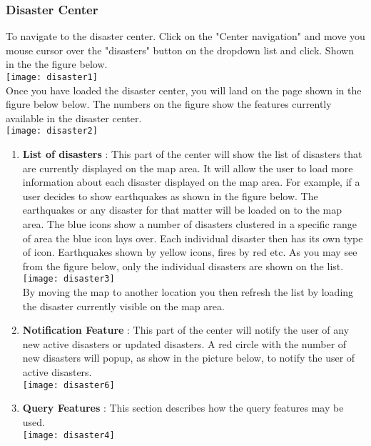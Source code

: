 \subsubsection{Disaster Center}
To navigate to the disaster center. Click on the "Center navigation" and move you mouse cursor over the "disasters" button on the dropdown list and click. Shown in the the figure below. \\[0.5cm]
\texttt{[image: disaster1]} \\[0.5cm]
Once you have loaded the disaster center, you will land on the page shown in the figure below below. The numbers on the figure show the features currently available in the disaster center. \\[0.5cm]
\texttt{[image: disaster2]} \\[0.5cm]
	\begin{enumerate}
		\item \textbf{List of disasters} : This part of the center will show the list of disasters that are currently displayed on the map area. It will allow the user to load more information about each disaster displayed on the map area. For example, if a user decides to show earthquakes as shown in the figure below. The earthquakes or any disaster for that matter will be loaded on to the map area. The blue icons show a number of disasters clustered in a specific range of area the blue icon lays over. Each individual disaster then has its own type of icon. Earthquakes shown by yellow icons, fires by red etc. As you may see from the figure below, only the individual disasters are shown on the list. \\[0.5cm]
		\texttt{[image: disaster3]} \\[0.5cm]
		By moving the map to another location you then refresh the list by loading the disaster currently visible on the map area.
		\item \textbf{Notification Feature} : This part of the center will notify the user of any new active disasters or updated disasters. A red circle with the number of new disasters will popup, as show in the picture below, to notify the user of active disasters.\\[0.5cm]
		\texttt{[image: disaster6]}\\[0.5cm]
		\item \textbf{Query Features} : 
		This section describes how the query features may be used.\\[0.5cm]
		\texttt{[image: disaster4]} \\[0.5cm]		

\end{enumerate}
